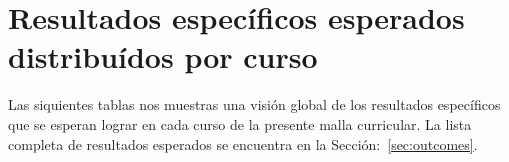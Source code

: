 \section{Resultados específicos esperados distribuí­dos por curso}\label{sec:specific-outcomes-by-course}
Las siquientes tablas nos muestras una visión global de los resultados específicos que se esperan lograr en cada 
curso de la presente malla curricular. 
La lista completa de resultados esperados se encuentra en la Sección:~\ref{sec:outcomes}.
